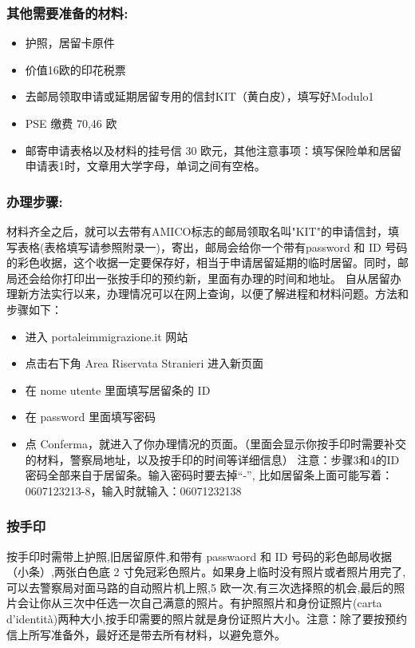 \documentclass[3pt,a5paper,openright,twoside]{book}
\begin{document}
\subsubsection{其他需要准备的材料:}
\begin{itemize} 
\item 护照，居留卡原件
\item 价值16欧的印花税票
\item 去邮局领取申请或延期居留专用的信封KIT（黄白皮），填写好Modulo1
\item PSE 缴费 70,46 欧
\item 邮寄申请表格以及材料的挂号信 30 欧元，其他注意事项：填写保险单和居留申请表1时，文章用大学字母，单词之间有空格。
\end{itemize}


\subsubsection{办理步骤:}
材料齐全之后，就可以去带有AMICO标志的邮局领取名叫"KIT"的申请信封，填写表格(表格填写请参照附录一)，寄出，邮局会给你一个带有password 和 ID 号码的彩色收据，这个收据一定要保存好，相当于申请居留延期的临时居留。同时，邮局还会给你打印出一张按手印的预约新，里面有办理的时间和地址。
自从居留办理新方法实行以来，办理情况可以在网上查询，以便了解进程和材料问题。方法和步骤如下：
\begin{itemize} 
\item 进入 portaleimmigrazione.it 网站
\item 点击右下角 Area Riservata Stranieri 进入新页面
\item 在 nome utente 里面填写居留条的 ID
\item 在 password 里面填写密码
\item 点 Conferma，就进入了你办理情况的页面。（里面会显示你按手印时需要补交的材料，警察局地址，以及按手印的时间等详细信息）
注意：步骤3和4的ID密码全部来自于居留条。输入密码时要去掉“-”, 比如居留条上面可能写着： 0607123213-8，输入时就输入：06071232138
\end{itemize}

\subsubsection{按手印}
按手印时需带上护照,旧居留原件,和带有 passwaord 和 ID 号码的彩色邮局收据（小条）,两张白色底 2 寸免冠彩色照片。如果身上临时没有照片或者照片用完了,可以去警察局对面马路的自动照片机上照,5 欧一次,有三次选择照的机会,最后的照片会让你从三次中任选一次自己满意的照片。有护照照片和身份证照片(carta d'identit\`a)两种大小,按手印需要的照片就是身份证照片大小。注意：除了要按预约信上所写准备外，最好还是带去所有材料，以避免意外。
\end{document}
